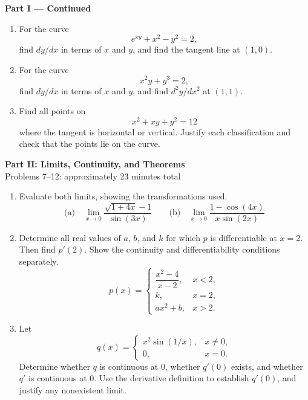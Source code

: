 \documentclass[11pt]{article}
\begin{document}
\newpage
\begin{center}
  {\large\textbf{Part I --- Continued}}
\end{center}

\begin{enumerate}[leftmargin=*,itemsep=0pt,resume]
  \item For the curve
  \[
    e^{xy}+x^2-y^2=2,
  \]
  find $dy/dx$ in terms of $x$ and $y$, and find the tangent line at $(1,0)$.

  \item For the curve
  \[
    x^2y+y^3=2,
  \]
  find $dy/dx$ in terms of $x$ and $y$, and find $d^2y/dx^2$ at $(1,1)$.

  \item Find all points on
  \[
    x^2+xy+y^2=12
  \]
  where the tangent is horizontal or vertical. Justify each classification
  and check that the points lie on the curve.
\end{enumerate}

\newpage
\begin{center}
  {\large\textbf{Part II: Limits, Continuity, and Theorems}}\\[2pt]
  Problems 7--12: approximately 23 minutes total
\end{center}

\begin{enumerate}[leftmargin=*,itemsep=0pt,resume]
  \item Evaluate both limits, showing the transformations used.
  \[
    \text{(a)}\quad \lim_{x\to0}\frac{\sqrt{1+4x}-1}{\sin(3x)}
    \qquad
    \text{(b)}\quad \lim_{x\to0}\frac{1-\cos(4x)}{x\sin(2x)}
  \]

  \item Determine all real values of $a$, $b$, and $k$ for which $p$ is
  differentiable at $x=2$. Then find $p'(2)$. Show the continuity and
  differentiability conditions separately.
  \[
    p(x)=
    \begin{cases}
      \dfrac{x^2-4}{x-2}, & x<2,\\[6pt]
      k, & x=2,\\[2pt]
      ax^2+b, & x>2.
    \end{cases}
  \]

  \item Let
  \[
    q(x)=
    \begin{cases}
      x^2\sin(1/x), & x\ne0,\\
      0, & x=0.
    \end{cases}
  \]
  Determine whether $q$ is continuous at $0$, whether $q'(0)$ exists, and
  whether $q'$ is continuous at $0$. Use the derivative definition to
  establish $q'(0)$, and justify any nonexistent limit.
\end{enumerate}
\end{document}
